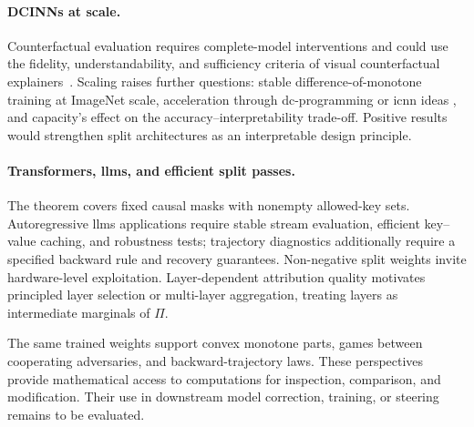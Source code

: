 \paragraph{DCINNs at scale.} Counterfactual evaluation requires complete-model interventions and could use the fidelity, understandability, and sufficiency criteria of visual counterfactual explainers~\parencite{Bender2026Desiderata}. Scaling raises further questions: stable difference-of-monotone training at ImageNet scale, acceleration through \ac{dc}-programming \parencite{LeThi2018DCA} or \ac{icnn} ideas \parencite{Amos2017}, and capacity's effect on the accuracy--interpretability trade-off. Positive results would strengthen split architectures as an interpretable design principle.

\paragraph{Transformers, \acsp{llm}, and efficient split passes.} The theorem covers fixed causal masks with nonempty allowed-key sets. Autoregressive \acp{llm} applications require stable stream evaluation, efficient key--value caching, and robustness tests; trajectory diagnostics additionally require a specified backward rule and recovery guarantees. Non-negative split weights invite hardware-level exploitation. Layer-dependent attribution quality motivates principled layer selection or multi-layer aggregation, treating layers as intermediate marginals of $\Pi$.

\bigskip

The same trained weights support convex monotone parts, games between cooperating adversaries, and backward-trajectory laws. These perspectives provide mathematical access to computations for inspection, comparison, and modification. Their use in downstream model correction, training, or steering remains to be evaluated.
